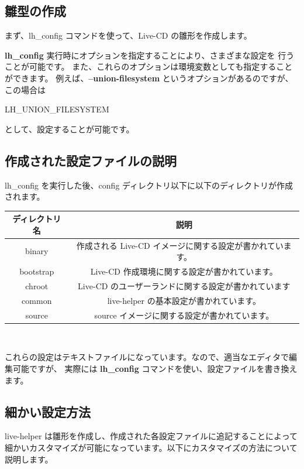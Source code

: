 \documentclass[mingoth,a4paper]{jsarticle}
\begin{document}
\subsection{雛型の作成}
まず、lh\_config コマンドを使って、Live-CD の雛形を作成します。
\begin{commandline}
\end{commandline}

{\bf lh\_config} 実行時にオプションを指定することにより、さまざまな設定を
行うことが可能です。
また、これらのオプションは環境変数としても指定することができます。
例えば、{\bf --union-filesystem} というオプションがあるのですが、この場合は
\begin{commandline}
LH_UNION_FILESYSTEM
\end{commandline}
として、設定することが可能です。

\subsection{作成された設定ファイルの説明}
lh\_config を実行した後、config ディレクトリ以下に以下のディレクトリが作成されます。
\begin{center}
\begin{tabular}{|c|c|}
\hline
ディレクトリ名 & 説明 \\ \hline \hline
binary & 作成される Live-CD イメージに関する設定が書かれています。\\ \hline
bootstrap & Live-CD 作成環境に関する設定が書かれています。\\ \hline
chroot & Live-CD のユーザーランドに関する設定が書かれています\\ \hline
common & live-helper の基本設定が書かれています。\\ \hline
source & source イメージに関する設定が書かれています。\\ \hline
\end{tabular}\\
\end{center}

これらの設定はテキストファイルになっています。なので、適当なエディタで編集可能ですが、
実際には {\bf lh\_config} コマンドを使い、設定ファイルを書き換えます。


\subsection{細かい設定方法}
live-helper は雛形を作成し、作成された各設定ファイルに追記することによって
細かいカスタマイズが可能になっています。以下にカスタマイズの方法について説明します。
\end{document}
